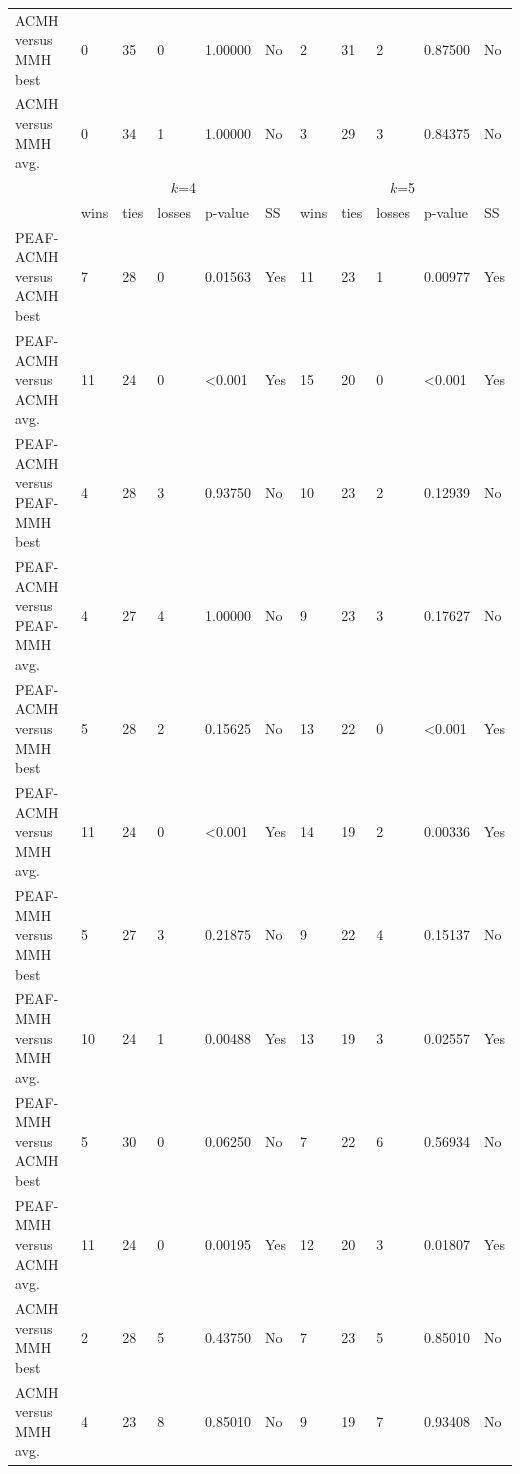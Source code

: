 \documentclass[12pt, a4paper]{article}%
\numberwithin{equation}{section}
\theoremstyle{plain}
\begin{document}
{\begin{landscape}
\begin{longtable}{|l|lllll|lllll|}
						ACMH versus MMH best                   & 0    & 35   & 0      & 1.00000          & No  & 2    & 31   & 2      & 0.87500          & No  \\
						ACMH versus MMH avg.                   & 0    & 34   & 1      & 1.00000          & No  & 3    & 29   & 3      & 0.84375          & No  \\ \hline
						\multicolumn{1}{|c|}{\multirow{2}{*}{}} & \multicolumn{5}{c|}{$k$=4}                    & \multicolumn{5}{c|}{$k$=5}                    \\ \cline{2-11} 
						\multicolumn{1}{|c|}{}                  & wins & ties & losses & p-value          & SS  & wins & ties & losses & p-value          & SS  \\ \hline
						PEAF-ACMH versus ACMH best             & 7    & 28   & 0      & 0.01563          & Yes & 11   & 23   & 1      & 0.00977          & Yes \\
						PEAF-ACMH versus ACMH avg.             & 11   & 24   & 0      & \textless{}0.001 & Yes & 15   & 20   & 0      & \textless{}0.001 & Yes \\
						PEAF-ACMH versus PEAF-MMH best           & 4    & 28   & 3      & 0.93750          & No  & 10   & 23   & 2      & 0.12939          & No  \\
						PEAF-ACMH versus PEAF-MMH avg.           & 4    & 27   & 4      & 1.00000          & No  & 9    & 23   & 3      & 0.17627          & No  \\
						PEAF-ACMH versus MMH best               & 5    & 28   & 2      & 0.15625          & No  & 13   & 22   & 0      & \textless{}0.001 & Yes \\
						PEAF-ACMH versus MMH avg.               & 11   & 24   & 0      & \textless{}0.001 & Yes & 14   & 19   & 2      & 0.00336          & Yes \\
						PEAF-MMH versus MMH best                 & 5    & 27   & 3      & 0.21875          & No  & 9    & 22   & 4      & 0.15137          & No  \\
						PEAF-MMH versus MMH avg.                 & 10   & 24   & 1      & 0.00488          & Yes & 13   & 19   & 3      & 0.02557          & Yes \\
						PEAF-MMH versus ACMH best               & 5    & 30   & 0      & 0.06250          & No  & 7    & 22   & 6      & 0.56934          & No  \\
						PEAF-MMH versus ACMH avg.               & 11   & 24   & 0      & 0.00195          & Yes & 12   & 20   & 3      & 0.01807          & Yes \\
						ACMH versus MMH best                   & 2    & 28   & 5      & 0.43750          & No  & 7    & 23   & 5      & 0.85010          & No  \\
						ACMH versus MMH avg.                   & 4    & 23   & 8      & 0.85010          & No  & 9    & 19   & 7      & 0.93408          & No  \\ \hline
					\end{longtable}
				\end{landscape}
			}
			
\end{document}
